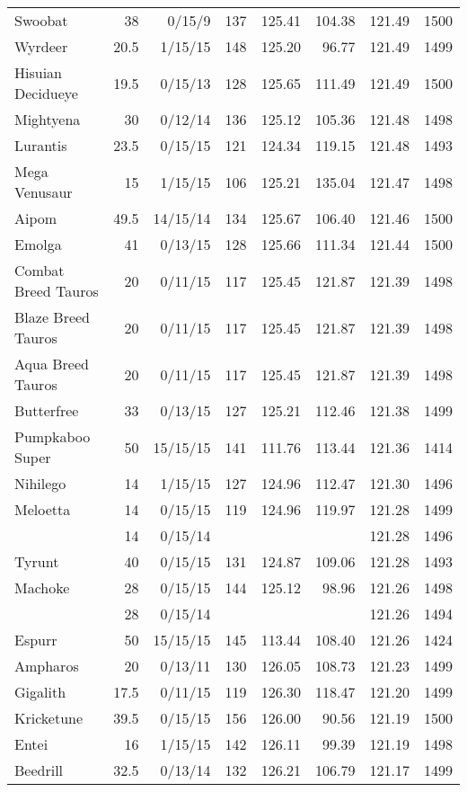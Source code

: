 \begin{longtable}{lrrrrrrr}
Swoobat & 38 & 0/15/9 & 137 & 125.41 & 104.38 & 121.49 & 1500\\
Wyrdeer & 20.5 & 1/15/15 & 148 & 125.20 & 96.77 & 121.49 & 1499\\
Hisuian Decidueye & 19.5 & 0/15/13 & 128 & 125.65 & 111.49 & 121.49 & 1500\\
Mightyena & 30 & 0/12/14 & 136 & 125.12 & 105.36 & 121.48 & 1498\\
Lurantis & 23.5 & 0/15/15 & 121 & 124.34 & 119.15 & 121.48 & 1493\\
Mega Venusaur & 15 & 1/15/15 & 106 & 125.21 & 135.04 & 121.47 & 1498\\
Aipom & 49.5 & 14/15/14 & 134 & 125.67 & 106.40 & 121.46 & 1500\\
Emolga & 41 & 0/13/15 & 128 & 125.66 & 111.34 & 121.44 & 1500\\
Combat Breed Tauros & 20 & 0/11/15 & 117 & 125.45 & 121.87 & 121.39 & 1498\\
Blaze Breed Tauros & 20 & 0/11/15 & 117 & 125.45 & 121.87 & 121.39 & 1498\\
Aqua Breed Tauros & 20 & 0/11/15 & 117 & 125.45 & 121.87 & 121.39 & 1498\\
Butterfree & 33 & 0/13/15 & 127 & 125.21 & 112.46 & 121.38 & 1499\\
Pumpkaboo Super & 50 & 15/15/15 & 141 & 111.76 & 113.44 & 121.36 & 1414\\
Nihilego & 14 & 1/15/15 & 127 & 124.96 & 112.47 & 121.30 & 1496\\
Meloetta & 14 & 0/15/15 & 119 & 124.96 & 119.97 & 121.28 & 1499\\
 & 14 & 0/15/14 & & & & 121.28 & 1496\\
Tyrunt & 40 & 0/15/15 & 131 & 124.87 & 109.06 & 121.28 & 1493\\
Machoke & 28 & 0/15/15 & 144 & 125.12 & 98.96 & 121.26 & 1498\\
 & 28 & 0/15/14 & & & & 121.26 & 1494\\
Espurr & 50 & 15/15/15 & 145 & 113.44 & 108.40 & 121.26 & 1424\\
Ampharos & 20 & 0/13/11 & 130 & 126.05 & 108.73 & 121.23 & 1499\\
Gigalith & 17.5 & 0/11/15 & 119 & 126.30 & 118.47 & 121.20 & 1499\\
Kricketune & 39.5 & 0/15/15 & 156 & 126.00 & 90.56 & 121.19 & 1500\\
Entei & 16 & 1/15/15 & 142 & 126.11 & 99.39 & 121.19 & 1498\\
Beedrill & 32.5 & 0/13/14 & 132 & 126.21 & 106.79 & 121.17 & 1499\\

\end{longtable}
